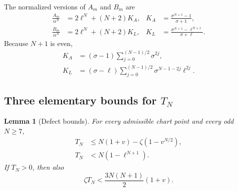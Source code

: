 \documentclass[11pt]{article}
\newtheorem{lemma}[theorem]{Lemma}
\begin{document}
The normalized versions of \(A_m\) and \(B_m\) are
\begin{align}
 \frac{A_m}{\alpha^N}
 &=2\ell^N+(N+2)K_A,
 &
 K_A&=\frac{\sigma^{N+1}-1}{\sigma+1},
 \label{eq:KA-def}\\
 \frac{B_m}{\alpha^N}
 &=2\ell^N+(N+2)K_L,
 &
 K_L&=\frac{\sigma^{N+1}-\ell^{N+1}}{\sigma+\ell}.
 \label{eq:KL-def}
\end{align}
Because \(N+1\) is even,
\begin{align}
 K_A&=(\sigma-1)
       \sum_{j=0}^{(N-1)/2}\sigma^{2j},
 \label{eq:KA-sum}\\
 K_L&=(\sigma-\ell)
       \sum_{j=0}^{(N-1)/2}
       \sigma^{N-1-2j}\ell^{2j}.
 \label{eq:KL-sum}
\end{align}

\subsection{Three elementary bounds for \texorpdfstring{\(T_N\)}{TN}}

\begin{lemma}[Defect bounds]\label{lem:T-bounds}
For every admissible chart point and every odd \(N\ge7\),
\begin{align}
 T_N&\le N(1+v)-\zeta(1-v^{N/2}),
 \label{eq:T-bound-one}\\
 T_N&<N(1-\ell^{N+1}).
 \label{eq:T-bound-two}
\end{align}
If \(T_N>0\), then also
\begin{equation}\label{eq:T-tangent-bound}
       \zeta T_N<\frac{3N(N+1)}2(1+v).
\end{equation}
\end{lemma}
\end{document}
